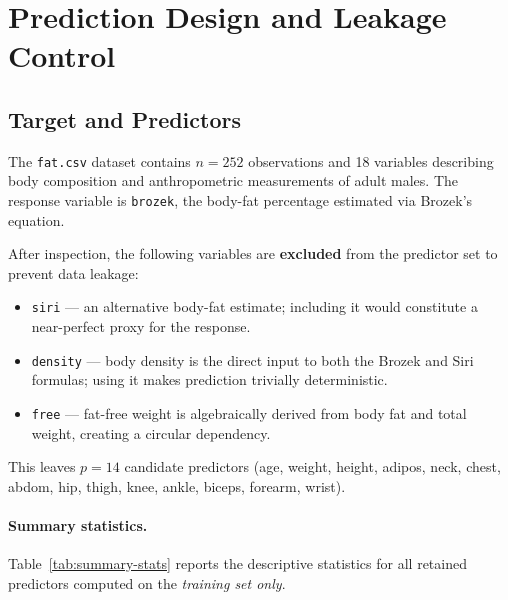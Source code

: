 \section{Prediction Design and Leakage Control}
\label{sec:prediction-design}

\subsection{Target and Predictors}
\label{sec:target-predictors}

The \texttt{fat.csv} dataset contains $n = 252$ observations and 18 variables
describing body composition and anthropometric measurements of adult males.
The response variable is \texttt{brozek}, the body-fat percentage estimated via
Brozek's equation.

After inspection, the following variables are \textbf{excluded} from the
predictor set to prevent data leakage:
%
\begin{itemize}
    \item \texttt{siri} — an alternative body-fat estimate; including it would
          constitute a near-perfect proxy for the response.
    \item \texttt{density} — body density is the direct input to both the Brozek
          and Siri formulas; using it makes prediction trivially deterministic.
    \item \texttt{free} — fat-free weight is algebraically derived from body fat
          and total weight, creating a circular dependency.
\end{itemize}
%

This leaves $p = 14$ candidate predictors (age, weight, height, adipos, neck,
chest, abdom, hip, thigh, knee, ankle, biceps, forearm, wrist).

\paragraph{Summary statistics.}
Table~\ref{tab:summary-stats} reports the descriptive statistics for all
retained predictors computed on the \emph{training set only}.

